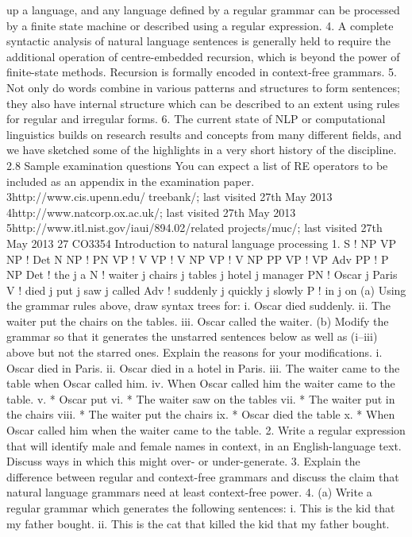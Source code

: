 up a language, and any language defined by a regular grammar can be
processed by a finite state machine or described using a regular expression.
4. A complete syntactic analysis of natural language sentences is generally held to
require the additional operation of centre-embedded recursion, which is beyond
the power of finite-state methods. Recursion is formally encoded in context-free
grammars.
5. Not only do words combine in various patterns and structures to form sentences;
they also have internal structure which can be described to an extent using rules
for regular and irregular forms.
6. The current state of NLP or computational linguistics builds on research results
and concepts from many different fields, and we have sketched some of the
highlights in a very short history of the discipline.
2.8 Sample examination questions
You can expect a list of RE operators to be included as an appendix in the
examination paper.
3http://www.cis.upenn.edu/treebank/; last visited 27th May 2013
4http://www.natcorp.ox.ac.uk/; last visited 27th May 2013
5http://www.itl.nist.gov/iaui/894.02/related projects/muc/; last visited 27th May 2013
27
CO3354 Introduction to natural language processing
1. S ! NP VP
NP ! Det N
NP ! PN
VP ! V
VP ! V NP
VP ! V NP PP
VP ! VP Adv
PP ! P NP
Det ! the j a
N ! waiter j chairs j tables j hotel j manager
PN ! Oscar j Paris
V ! died j put j saw j called
Adv ! suddenly j quickly j slowly
P ! in j on
(a) Using the grammar rules above, draw syntax trees for:
i. Oscar died suddenly.
ii. The waiter put the chairs on the tables.
iii. Oscar called the waiter.
(b) Modify the grammar so that it generates the unstarred sentences below as
well as (i–iii) above but not the starred ones. Explain the reasons for your
modifications.
i. Oscar died in Paris.
ii. Oscar died in a hotel in Paris.
iii. The waiter came to the table when Oscar called him.
iv. When Oscar called him the waiter came to the table.
v. * Oscar put
vi. * The waiter saw on the tables
vii. * The waiter put in the chairs
viii. * The waiter put the chairs
ix. * Oscar died the table
x. * When Oscar called him when the waiter came to the table.
2. Write a regular expression that will identify male and female names in context,
in an English-language text. Discuss ways in which this might over- or
under-generate.
3. Explain the difference between regular and context-free grammars and discuss
the claim that natural language grammars need at least context-free power.
4. (a) Write a regular grammar which generates the following sentences:
i. This is the kid that my father bought.
ii. This is the cat that killed the kid that my father bought.
